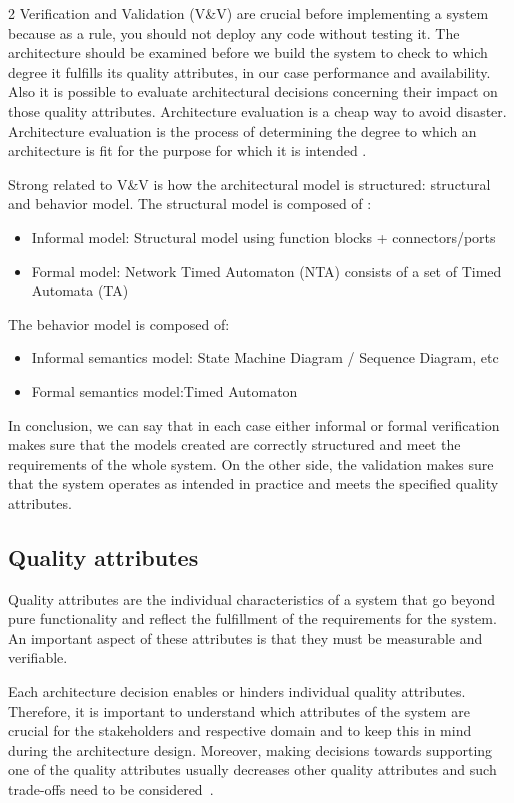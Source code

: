\documentclass{article}
\begin{document}
\begin{multicols}{2}
Verification and Validation (V\&V) are crucial before implementing a system because as a rule, you should not deploy any code without testing it. The architecture should be examined before we build the system to check to which degree it fulfills its quality attributes, in our case performance and availability. Also it is possible to evaluate architectural decisions concerning their impact on those quality attributes. Architecture evaluation is a cheap way to avoid disaster. Architecture evaluation is the process of determining the degree to which an architecture is fit for the purpose for which it is intended \cite{b20}. 

Strong related to V\&V is how the architectural model is structured: structural and behavior model. The structural model is composed of : 
\begin{itemize}
    \item Informal model: Structural model using function blocks + connectors/ports
    \item Formal model: Network Timed Automaton (NTA) consists of a set of Timed Automata (TA)
\end{itemize}
The behavior model is composed of:
\begin{itemize}
    \item Informal semantics model: State Machine Diagram / Sequence Diagram, etc
    \item Formal semantics model:Timed Automaton
    \cite{b21}
\end{itemize}

In conclusion, we can say that in each case either informal or formal verification makes sure that the models created are correctly structured and meet the requirements of the whole system. On the other side, the validation makes sure that the system operates as intended in practice and meets the specified quality attributes.


\subsection{Quality attributes}
Quality attributes are the individual characteristics of a system that go beyond pure functionality and reflect the fulfillment of the requirements for the system. An important aspect of these attributes is that they must be measurable and verifiable.

Each architecture decision enables or hinders individual quality attributes. Therefore, it is important to understand which attributes of the system are crucial for the stakeholders and respective domain and to keep this in mind during the architecture design. Moreover, making decisions towards supporting one of the quality attributes usually decreases other quality attributes and such trade-offs need to be considered~\cite{b1}.


\end{multicols}
\end{document}
